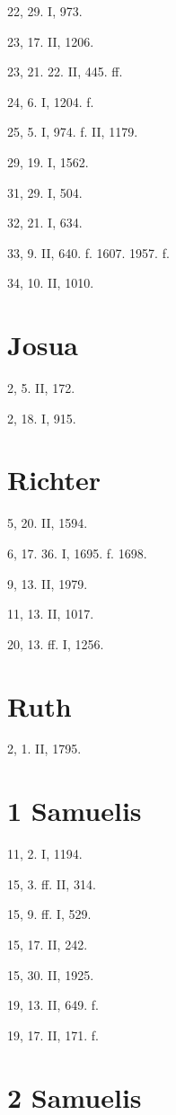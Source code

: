 22, 29. I, 973.

23, 17. II, 1206.

23, 21. 22. II, 445. ff.

24, 6. I, 1204. f.

25, 5. I, 974. f. II, 1179.

29, 19. I, 1562.

31, 29. I, 504.

32, 21. I, 634.

33, 9. II, 640. f. 1607. 1957. f.

34, 10. II, 1010.

\section{Josua}

2, 5. II, 172.

2, 18. I, 915.

\section{Richter}

5, 20. II, 1594.

6, 17. 36. I, 1695. f. 1698.

9, 13. II, 1979.

11, 13. II, 1017.

20, 13. ff. I, 1256.

\section{Ruth}

2, 1. II, 1795.

\section{1 Samuelis}

11, 2. I, 1194.

15, 3. ff. II, 314.

15, 9. ff. I, 529.

15, 17. II, 242.

15, 30. II, 1925.

19, 13. II, 649. f.

19, 17. II, 171. f.

\section{2 Samuelis}

